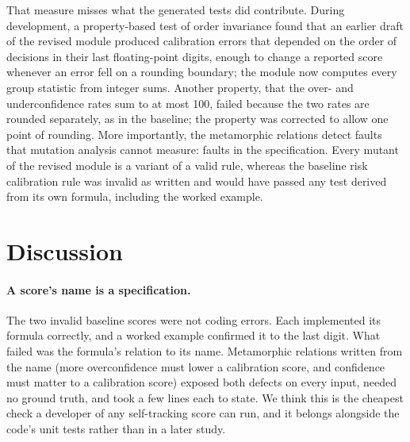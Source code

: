 \documentclass[12pt,a4paper]{article}
\newcommand{\tabnote}[1]{\par\vspace{2pt}{\footnotesize\raggedright #1\par}}
\begin{document}
\begin{table}[t]
\caption{Mutation analysis of the revised scoring module (\MutTotal{} mutants)}\label{tab:mut}

\tabnote{Score, killed mutants as a percentage of all mutants.}
\end{table}

That measure misses what the generated tests did contribute. During development, a property-based test of order invariance found that an earlier draft of the revised module produced calibration errors that depended on the order of decisions in their last floating-point digits, enough to change a reported score whenever an error fell on a rounding boundary; the module now computes every group statistic from integer sums. Another property, that the over- and underconfidence rates sum to at most 100, failed because the two rates are rounded separately, as in the baseline; the property was corrected to allow one point of rounding. More importantly, the metamorphic relations detect faults that mutation analysis cannot measure: faults in the specification. Every mutant of the revised module is a variant of a valid rule, whereas the baseline risk calibration rule was invalid as written and would have passed any test derived from its own formula, including the worked example.

\section{Discussion}\label{sec:discussion}

\paragraph{A score's name is a specification.} The two invalid baseline scores were not coding errors. Each implemented its formula correctly, and a worked example confirmed it to the last digit. What failed was the formula's relation to its name. Metamorphic relations written from the name (more overconfidence must lower a calibration score, and confidence must matter to a calibration score) exposed both defects on every input, needed no ground truth, and took a few lines each to state. We think this is the cheapest check a developer of any self-tracking score can run, and it belongs alongside the code's unit tests rather than in a later study.
\end{document}
